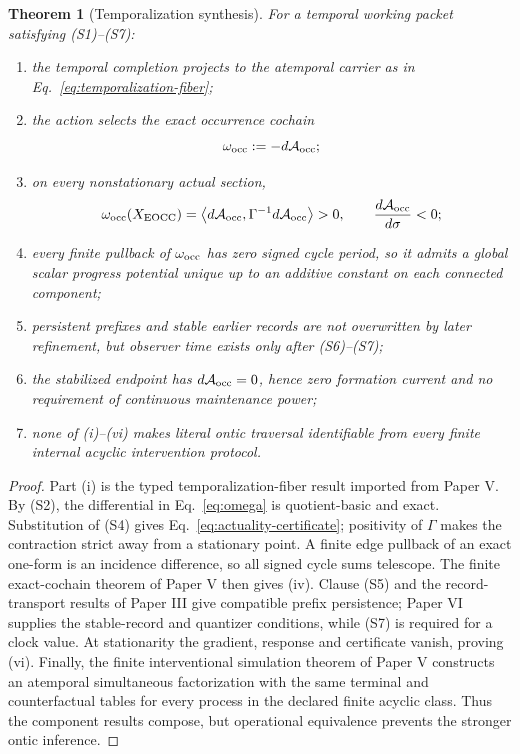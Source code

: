\documentclass[11pt]{article}
\newtheorem{theorem}{Theorem}
\begin{document}
\begin{theorem}[Temporalization synthesis]
\label{thm:synthesis}
For a temporal working packet satisfying (S1)--(S7):
\begin{enumerate}[label=(\roman*)]
\item the temporal completion projects to the atemporal carrier as in
      Eq.~\eqref{eq:temporalization-fiber};
\item the action selects the exact occurrence cochain
      \begin{equation}
      \omega_{\rm occ}:=-d\mathcal A_{\rm occ};
      \label{eq:omega}
      \end{equation}
\item on every nonstationary actual section,
      \begin{equation}
      \omega_{\rm occ}(X_{\rm EOCC})
      =\left\langle d\mathcal A_{\rm occ},
       \Gamma^{-1}d\mathcal A_{\rm occ}\right\rangle>0,
      \qquad
      \frac{d\mathcal A_{\rm occ}}{d\sigma}<0;
      \label{eq:actuality-certificate}
      \end{equation}
\item every finite pullback of \(\omega_{\rm occ}\) has zero signed cycle
      period, so it admits a global scalar progress potential unique up to
      an additive constant on each connected component;
\item persistent prefixes and stable earlier records are not overwritten by
      later refinement, but observer time exists only after (S6)--(S7);
\item the stabilized endpoint has \(d\mathcal A_{\rm occ}=0\), hence zero
      formation current and no requirement of continuous maintenance power;
\item none of (i)--(vi) makes literal ontic traversal identifiable from every
      finite internal acyclic intervention protocol.
\end{enumerate}
\end{theorem}

\begin{proof}
Part (i) is the typed temporalization-fiber result imported from Paper V.  By
(S2), the differential in Eq.~\eqref{eq:omega} is quotient-basic and exact.
Substitution of (S4) gives Eq.~\eqref{eq:actuality-certificate}; positivity of
\(\Gamma\) makes the contraction strict away from a stationary point.  A
finite edge pullback of an exact one-form is an incidence difference, so all
signed cycle sums telescope.  The finite exact-cochain theorem of Paper V
then gives (iv).  Clause (S5) and the record-transport results of Paper III
give compatible prefix persistence; Paper VI supplies the stable-record and
quantizer conditions, while (S7) is required for a clock value.  At
stationarity the gradient, response and certificate vanish, proving (vi).
Finally, the finite interventional simulation theorem of Paper V constructs
an atemporal simultaneous factorization with the same terminal and
counterfactual tables for every process in the declared finite acyclic class.
Thus the component results compose, but operational equivalence prevents the
stronger ontic inference.
\end{proof}
\end{document}
